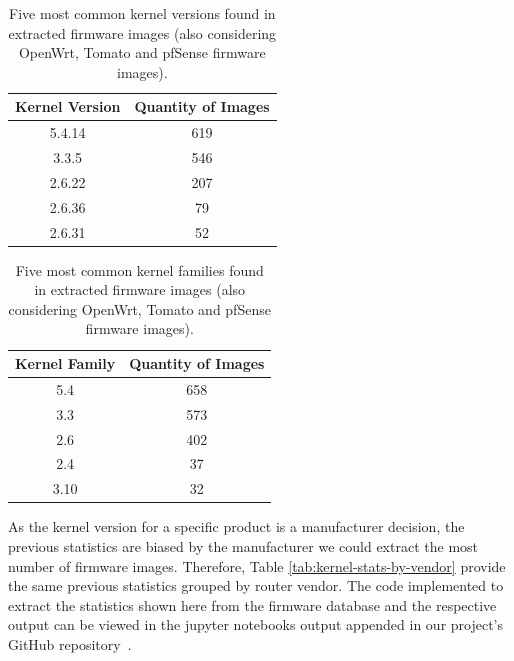 \begin{table}[H]
\centering
\caption{Five most common kernel versions found in extracted firmware images (also considering OpenWrt, Tomato and pfSense firmware images).}
\begin{tabular}{cc}
\hline
\textbf{Kernel Version} & \textbf{Quantity of Images} \\ \hline
5.4.14                  & 619                \\
3.3.5                   & 546                \\
2.6.22                  & 207                \\
2.6.36                  & 79                 \\
2.6.31                  & 52                 \\ \hline
\end{tabular}
\label{tab:kernel-stats-openwrt}
\end{table}

\begin{table}[H]
\centering
\caption{Five most common kernel families found in extracted firmware images (also considering OpenWrt, Tomato and pfSense firmware images).}
\begin{tabular}{cc}
\hline
\textbf{Kernel Family} & \textbf{Quantity of Images} \\ \hline
5.4                    & 658                \\ 
3.3                    & 573                \\ 
2.6                    & 402                \\ 
2.4                    & 37                 \\ 
3.10                   & 32                 \\ \hline
\end{tabular}
\label{tab:kernel-family-stats-openwrt}
\end{table}

As the kernel version for a specific product is a manufacturer decision, the previous statistics are biased by the manufacturer we could extract the most number of firmware images. Therefore, Table \ref{tab:kernel-stats-by-vendor} provide the same previous statistics grouped by router vendor. The code implemented to extract the statistics shown here from the firmware database and the respective output can be viewed in the jupyter notebooks output appended in our project's GitHub repository~\cite{github:c2dc-toso}. 

